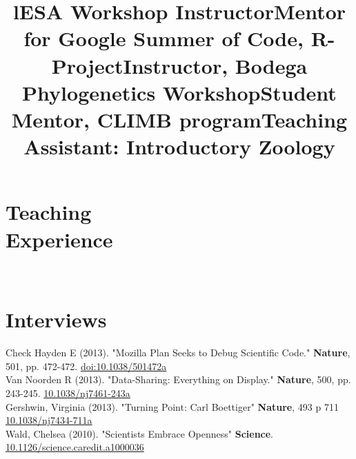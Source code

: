 \documentclass[margin]{res}
\begin{document}
\begin{resume}
\section{Teaching\\Experience}
\begin{format}
\title{l}\\
\body
\end{format}

\title{ESA Workshop Instructor}
\begin{position} \vspace{-.8cm} \end{position}
\title{Mentor for Google Summer of Code, R-Project}
\begin{position} \vspace{-.8cm} \end{position}
\title{Instructor, Bodega Phylogenetics Workshop}
\begin{position} \vspace{-.8cm} \end{position}
\title{Student Mentor, CLIMB program}
\begin{position} \vspace{-.8cm} \end{position}
\title{Teaching Assistant: Introductory Zoology}
 \begin{position} \vspace{-.0cm} \end{position}




\section{Interviews}

Check Hayden E (2013). "Mozilla Plan Seeks to Debug Scientific Code." \textbf{Nature}, 501, pp. 472-472. \href{http://doi.org/10.1038/501472a}{doi:10.1038/501472a} \\ 
Van Noorden R (2013). "Data-Sharing: Everything on Display." \textbf{Nature}, 500, pp. 243-245. \href{http://doi.org/10.1038/nj7461-243a}{10.1038/nj7461-243a} \\
Gershwin, Virginia (2013). "Turning Point: Carl Boettiger" \textbf{Nature}, 493 p 711 \href{http://doi.org/10.1038/nj7434-711a}{10.1038/nj7434-711a} \\
Wald, Chelsea (2010). "Scientists Embrace Openness" \textbf{Science}. \href{http://doi.org/10.1126/science.caredit.a1000036}{10.1126/science.caredit.a1000036} 


\end{resume}
\end{document}
